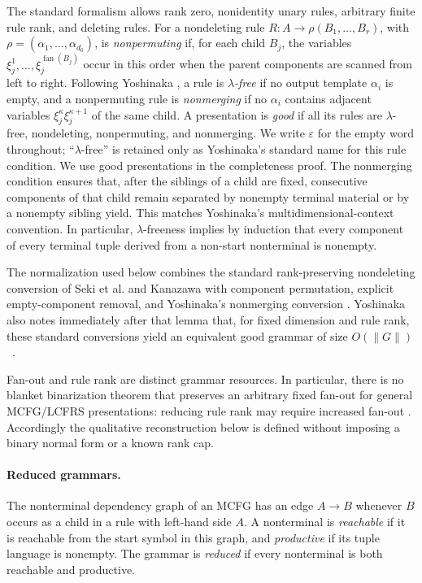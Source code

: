\documentclass[11pt]{article}
\numberwithin{equation}{section}
\theoremstyle{plain}
\theoremstyle{definition}
\theoremstyle{remark}
\newcommand{\eps}{\varepsilon}
\newcommand{\fan}{\operatorname{fan}}
\begin{document}
The standard formalism allows rank zero, nonidentity unary rules, arbitrary
finite rule rank, and deleting rules.  For a nondeleting rule
\(R:A\to\rho(B_1,\ldots,B_r)\), with
\(\rho=(\alpha_1,\ldots,\alpha_{d_0})\), is
\emph{nonpermuting} if, for each child \(B_j\), the variables
\(\xi_j^1,\ldots,\xi_j^{\fan(B_j)}\) occur in this order when the parent components
are scanned from left to right.  Following Yoshinaka
\cite[Section~2.3]{Yoshinaka2011}, a rule is \emph{$\lambda$-free} if no output
template $\alpha_i$ is empty, and a nonpermuting rule is \emph{nonmerging} if
no $\alpha_i$ contains adjacent variables $\xi_j^{\kappa} \xi_j^{\kappa+1}$ of the same child.
A presentation is \emph{good} if all its rules are $\lambda$-free,
nondeleting, nonpermuting, and nonmerging.  We write $\eps$ for the empty word
throughout; ``$\lambda$-free'' is retained only as Yoshinaka's standard name
for this rule condition.  We use good presentations in the completeness proof.  The nonmerging condition ensures that, after the siblings
of a child are fixed, consecutive components of that child remain separated
by nonempty terminal material or by a nonempty sibling yield.  This matches
Yoshinaka's multidimensional-context convention.  In particular,
$\lambda$-freeness implies by induction that every component of every terminal tuple derived from a non-start
nonterminal is nonempty.

The normalization used below combines the standard rank-preserving nondeleting
conversion of Seki et al. and Kanazawa with component permutation, explicit
empty-component removal, and Yoshinaka's nonmerging conversion
\cite[proof of Lemma~2.2]{SekiEtAl1991}\cite[Section~2.1]{Kanazawa2019Ogden}\cite[Section~2.3, Lemma~1]{Yoshinaka2011}.  Yoshinaka also notes immediately after that
lemma that, for fixed dimension and rule rank, these standard conversions yield
an equivalent good grammar of size $O(\|G\|)$~\cite[Section~2.3]{Yoshinaka2011}.

Fan-out and rule rank are distinct grammar resources.  In particular, there is
no blanket binarization theorem that preserves an arbitrary fixed fan-out for
general MCFG/LCFRS presentations: reducing rule rank may require increased
fan-out \cite{RambowSatta1999,GomezRodriguezEtAl2009}.
Accordingly the qualitative reconstruction below is defined without imposing a
binary normal form or a known rank cap.


\paragraph{Reduced grammars.}
The nonterminal dependency graph of an MCFG has an edge $A\to B$ whenever
$B$ occurs as a child in a rule with left-hand side $A$.
A nonterminal is \emph{reachable} if it is reachable from the start symbol in
this graph, and \emph{productive} if its tuple language is nonempty.
The grammar is \emph{reduced} if every nonterminal is both reachable and
productive.
\end{document}
